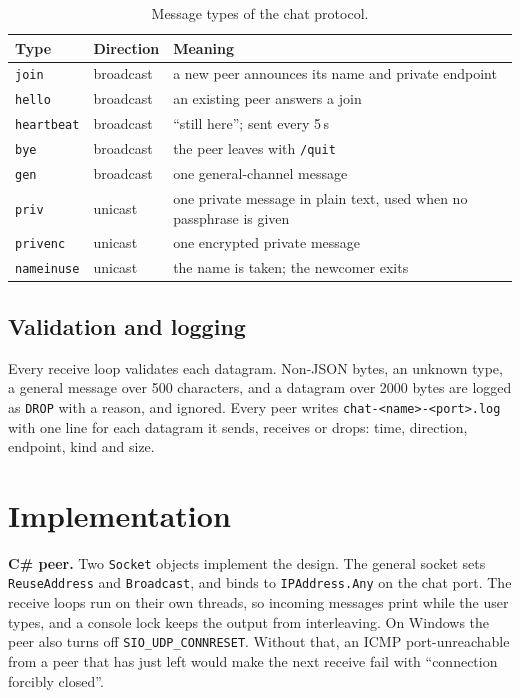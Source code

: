 \documentclass[12pt,a4paper]{article}
\begin{document}
\begin{table}[H]
\centering
\small
\begin{tabularx}{\textwidth}{@{}l l X@{}}
\toprule
\textbf{Type} & \textbf{Direction} & \textbf{Meaning} \\
\midrule
\texttt{join} & broadcast & a new peer announces its name and private endpoint \\
\texttt{hello} & broadcast & an existing peer answers a join \\
\texttt{heartbeat} & broadcast & ``still here''; sent every 5\,s \\
\texttt{bye} & broadcast & the peer leaves with \texttt{/quit} \\
\texttt{gen} & broadcast & one general-channel message \\
\texttt{priv} & unicast & one private message in plain text, used when no passphrase is given \\
\texttt{privenc} & unicast & one encrypted private message \\
\texttt{nameinuse} & unicast & the name is taken; the newcomer exits \\
\bottomrule
\end{tabularx}
\caption{Message types of the chat protocol.}
\label{tab:messages}
\end{table}

\subsection{Validation and logging}
Every receive loop validates each datagram. Non-JSON bytes, an unknown type, a
general message over 500 characters, and a datagram over 2000 bytes are logged as
\texttt{DROP} with a reason, and ignored. Every peer writes
\texttt{chat-<name>-<port>.log} with one line for each datagram it sends, receives
or drops: time, direction, endpoint, kind and size.

\section{Implementation}
\textbf{C\# peer.} Two \texttt{Socket} objects implement the design. The general
socket sets \texttt{ReuseAddress} and \texttt{Broadcast}, and binds to
\texttt{IPAddress.Any} on the chat port. The receive loops run on their own
threads, so incoming messages print while the user types, and a console lock keeps
the output from interleaving. On Windows the peer also turns off
\texttt{SIO\_UDP\_CONNRESET}. Without that, an ICMP port-unreachable from a peer
that has just left would make the next receive fail with ``connection forcibly
closed''.
\end{document}
